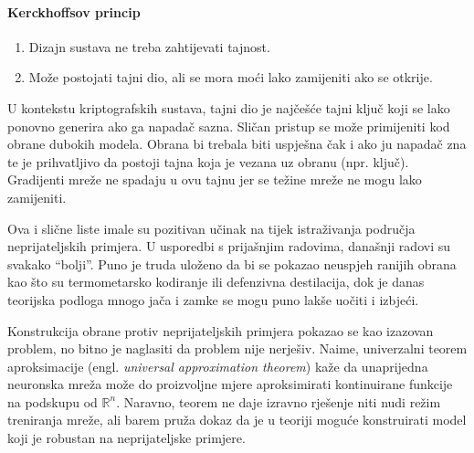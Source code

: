 \documentclass[utf8, diplomski]{fer}
\begin{document}
\paragraph{Kerckhoffsov princip}
\begin{enumerate}[noitemsep,topsep=0pt,parsep=0pt,partopsep=0pt]
	\item Dizajn sustava ne treba zahtijevati tajnost.
	\item Može postojati tajni dio, ali se mora moći lako zamijeniti ako se otkrije.
\end{enumerate}
U kontekstu kriptografskih sustava, tajni dio je najčešće tajni ključ koji se lako ponovno generira ako ga napadač sazna. Sličan pristup se može primijeniti kod obrane dubokih modela. Obrana bi trebala biti uspješna čak i ako ju napadač zna te je prihvatljivo da postoji tajna koja je vezana uz obranu (npr. ključ). Gradijenti mreže ne spadaju u ovu tajnu jer se težine mreže ne mogu lako zamijeniti. 
\par
Ova i slične liste imale su pozitivan učinak na tijek istraživanja područja neprijateljskih primjera. U usporedbi s prijašnjim radovima, današnji radovi su svakako ``bolji''. Puno je truda uloženo da bi se pokazao neuspjeh ranijih obrana kao što su termometarsko kodiranje ili defenzivna destilacija, dok je danas teorijska podloga mnogo jača i zamke se mogu puno lakše uočiti i izbjeći. \par
Konstrukcija obrane protiv neprijateljskih primjera pokazao se kao izazovan problem, no bitno je naglasiti da problem nije nerješiv. Naime, univerzalni teorem aproksimacije (engl. \textit{universal approximation theorem}) kaže da unaprijedna neuronska mreža može do proizvoljne mjere aproksimirati kontinuirane funkcije na podskupu od $\mathbb{R}^{n}$. Naravno, teorem ne daje izravno rješenje niti nudi režim treniranja mreže, ali barem pruža dokaz da je u teoriji moguće konstruirati model koji je robustan na neprijateljske primjere. 
\end{document}
